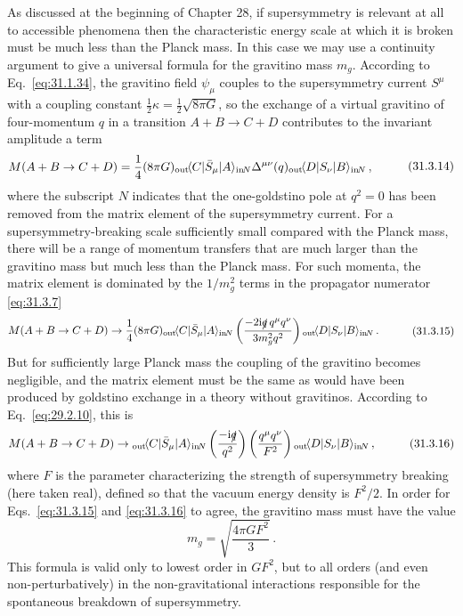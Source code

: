 As discussed at the beginning of Chapter 28, if supersymmetry is relevant
at all to accessible phenomena then the characteristic energy scale at
which it is broken must be much less than the Planck mass. In this case we
may use a continuity argument to give a universal formula for the
gravitino mass \(m_g\). According to Eq.~\eqref{eq:31.1.34}, the gravitino
field \(\psi_\mu\) couples to the supersymmetry current \(S^\mu\) with a
coupling constant \(\frac12\kappa=\frac12\sqrt{8\pi G}\), so the exchange
of a virtual gravitino of four-momentum \(q\) in a transition
\(A+B\to C+D\) contributes to the invariant amplitude a term
\begin{equation}
  \begin{aligned}
  M(A+B\to C+D)
  ={}&\frac14(8\pi G)
  {}_{\mathrm{out}}\!\langle C\rvert\bar S_\mu\lvert A\rangle_{\mathrm{in}}\!{}_{N}
  \Delta^{\mu\nu}(q)
  {}_{\mathrm{out}}\!\langle D\rvert S_\nu\lvert B\rangle_{\mathrm{in}}\!{}_{N}\,,
  \end{aligned}
  \tag{31.3.14}\label{eq:31.3.14}
\end{equation}
where the subscript \(N\) indicates that the one-goldstino pole at
\(q^2=0\) has been removed from the matrix element of the supersymmetry
current. For a supersymmetry-breaking scale sufficiently small compared
with the Planck mass, there will be a range of momentum transfers that are
much larger than the gravitino mass but much less than the Planck mass.
For such momenta, the matrix element is dominated by the \(1/m_g^2\)
terms in the propagator numerator \eqref{eq:31.3.7}
\begin{equation}
  \begin{aligned}
  M(A+B\to C+D)\to{}&
  \frac14(8\pi G)
  {}_{\mathrm{out}}\!\langle C\rvert\bar S_\mu\lvert A\rangle_{\mathrm{in}}\!{}_{N}
  \left(\frac{-2\mathrm{i}\slashed{q}\,q^\mu q^\nu}{3m_g^2q^2}\right)
  {}_{\mathrm{out}}\!\langle D\rvert S_\nu\lvert B\rangle_{\mathrm{in}}\!{}_{N}\,.
  \end{aligned}
  \tag{31.3.15}\label{eq:31.3.15}
\end{equation}
But for sufficiently large Planck mass the coupling of the gravitino
becomes negligible, and the matrix element must be the same as would have
been produced by goldstino exchange in a theory without gravitinos.
According to Eq.~\eqref{eq:29.2.10}, this is
\begin{equation}
  \begin{aligned}
  M(A+B\to C+D)\to{}&
  {}_{\mathrm{out}}\!\langle C\rvert\bar S_\mu\lvert A\rangle_{\mathrm{in}}\!{}_{N}
  \left(\frac{-\mathrm{i}\slashed{q}}{q^2}\right)
  \left(\frac{q^\mu q^\nu}{F^2}\right)
  {}_{\mathrm{out}}\!\langle D\rvert S_\nu\lvert B\rangle_{\mathrm{in}}\!{}_{N}\,,
  \end{aligned}
  \tag{31.3.16}\label{eq:31.3.16}
\end{equation}
where \(F\) is the parameter characterizing the strength of supersymmetry
breaking (here taken real), defined so that the vacuum energy density is
\(F^2/2\). In order for Eqs.~\eqref{eq:31.3.15} and
\eqref{eq:31.3.16} to agree, the gravitino mass must have the value
\begin{equation}
  m_g=\sqrt{\frac{4\pi G F^2}{3}}\,.
  \tag{31.3.17}\label{eq:31.3.17}
\end{equation}
This formula is valid only to lowest order in \(GF^2\), but to all orders
(and even non-perturbatively) in the non-gravitational interactions
responsible for the spontaneous breakdown of supersymmetry.

